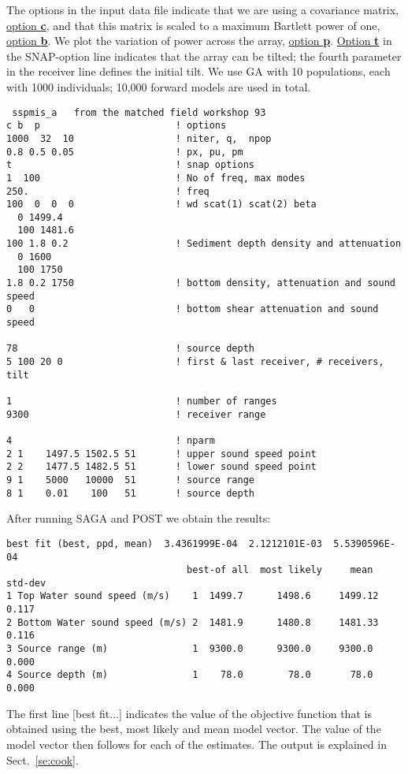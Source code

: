\documentclass{saclantc}
\begin{document}
The options in the input data file indicate that we are using a
covariance matrix, \underline{option {\bf c}}, and that this
matrix is scaled to a maximum Bartlett power of one, \underline{option
{\bf b}}. We plot the
variation of power across the array, \underline{option {\bf p}}. 
\underline{Option {\bf t}} in the {\sf SNAP}-option
line indicates that the
array can be tilted; the fourth parameter in the receiver line defines
the initial tilt.  We use GA with 10 populations,
each with 1000 individuals; 10,000 forward models are used in total.

\small
\begin{verbatim}
 sspmis_a   from the matched field workshop 93
c b  p                        ! options
1000  32  10                  ! niter, q,  npop
0.8 0.5 0.05                  ! px, pu, pm
t                             ! snap options
1  100                        ! No of freq, max modes 
250.                          ! freq
100  0  0  0                  ! wd scat(1) scat(2) beta
  0 1499.4  
  100 1481.6 
100 1.8 0.2                   ! Sediment depth density and attenuation
  0 1600                      
  100 1750
1.8 0.2 1750                  ! bottom density, attenuation and sound speed
0   0                         ! bottom shear attenuation and sound speed

78                            ! source depth
5 100 20 0                    ! first & last receiver, # receivers, tilt

1                             ! number of ranges
9300                          ! receiver range

4                             ! nparm 
2 1    1497.5 1502.5 51       ! upper sound speed point
2 2    1477.5 1482.5 51       ! lower sound speed point
9 1    5000   10000  51       ! source range
8 1    0.01    100   51       ! source depth 
\end{verbatim}
\normalsize

After running {\sf SAGA} and {\sf POST} we obtain the results: 


\small
\begin{verbatim}
best fit (best, ppd, mean)  3.4361999E-04  2.1212101E-03  5.5390596E-04
                                best-of all  most likely     mean   std-dev
1 Top Water sound speed (m/s)    1  1499.7      1498.6     1499.12    0.117
2 Bottom Water sound speed (m/s) 2  1481.9      1480.8     1481.33    0.116
3 Source range (m)               1  9300.0      9300.0     9300.0     0.000
4 Source depth (m)               1    78.0        78.0       78.0     0.000
\end{verbatim}
\normalsize
The first line [best fit...]
 indicates the  value of the objective function that
is obtained using the best, most likely and mean model vector. The
value of the model vector then follows for each of the estimates. The
output is explained in Sect.\ \ref{se:cook}.
\end{document}
